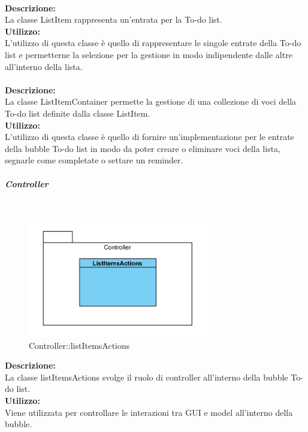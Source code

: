 \label{todo-item}\mbox{}\\
\textbf{Descrizione:}\\
La classe ListItem rappresenta un'entrata per la To-do list.\\
\textbf{Utilizzo:}\\
L'utilizzo di questa classe è quello di rappresentare le singole entrate della To-do list e permetterne la selezione per la gestione in modo indipendente dalle altre all'interno della lista.\\

\label{todo-container}\mbox{}\\
\textbf{Descrizione:}\\
La classe ListItemContainer permette la gestione di una collezione di voci della To-do list definite dalla classe ListItem.\\
\textbf{Utilizzo:}\\
L'utilizzo di questa classe è quello di fornire un'implementazione per le entrate della bubble To-do list in modo da poter creare o eliminare voci della lista, segnarle come completate o settare un reminder.\\

\subparagraph{Controller}\mbox{}
\begin{samepage}
	\label{todo-controller}\mbox{}\\
	\nopagebreak
	\begin{figure}[H]
		\centering
		\includegraphics[height=5cm]{diagrammi_img/classi_e_package/todo_controller}
		\caption{Controller\-::listItemsActions}
	\end{figure}
\end{samepage}
\textbf{Descrizione:}\\
La classe listItemsActions svolge il ruolo di controller all'interno della bubble To-do list. \\
\textbf{Utilizzo:}\\
Viene utilizzata per controllare le interazioni tra GUI e model all'interno della bubble. \\
